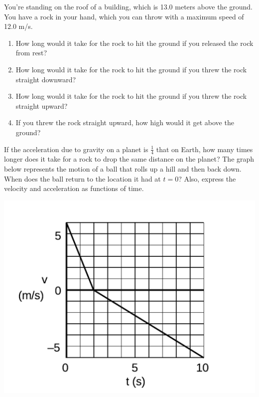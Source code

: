\documentclass[12pt,addpoints]{exam}
\begin{document}
\begin{center}
\begin{questions}
			\question You’re standing on the roof of a building, which is 13.0 meters above the ground. You have a rock in your hand, which you can throw with a maximum speed of 12.0 m/s.
			\begin{enumerate}[label=(\alph*)]
				\item How long would it take for the rock to hit the
				ground if you released the rock from rest?\vspace{1in}
				\item How long would it take for the rock to hit the
				ground if you threw the rock straight downward?\vspace{1in}
				\item How long would it take for the rock to hit the
				ground if you threw the rock straight upward?\vspace{1in}
				\item If you threw the rock straight upward, how
				high would it get above the ground?\vspace{1in}
			\end{enumerate}
			\question If the acceleration due to gravity on a planet is $\frac{1}{4}$ that on Earth, how many times longer does it take for a rock to drop the same distance on the planet?\vspace{1.5in}
			\question The graph below represents the motion of a ball that rolls up a hill and then back down. When does the ball return to the location it had at $t = 0$? Also, express the velocity and acceleration as functions of time.
			\begin{center}
				\includegraphics[scale=0.3]{graph1.png}

\end{center}
\end{questions}
\end{center}
\end{document}
